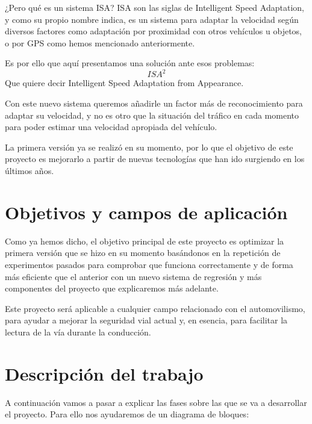 \documentclass[12pt,oneside,a4paper]{article}
\begin{document}
¿Pero qué es un sistema ISA? ISA son las siglas de Intelligent Speed Adaptation, y como su propio nombre indica, es un sistema para adaptar la velocidad según diversos factores como adaptación por proximidad con otros vehículos u objetos, o por GPS como hemos mencionado anteriormente.

Es por ello que aquí presentamos una solución ante esos problemas: \[ISA^{2}\]
Que quiere decir Intelligent Speed Adaptation from Appearance.

Con este nuevo sistema queremos añadirle un factor más de reconocimiento para adaptar su velocidad, y no es otro que la situación del tráfico en cada momento para poder estimar una velocidad apropiada del vehículo.

La primera versión ya se realizó en su momento, por lo que el objetivo de este proyecto es mejorarlo a partir de nuevas tecnologías que han ido surgiendo en los últimos años.

\section{Objetivos y campos de aplicación}

Como ya hemos dicho, el objetivo principal de este proyecto es optimizar la primera versión que se hizo en su momento basándonos en la repetición de experimentos pasados para comprobar que funciona correctamente y de forma más eficiente que el anterior con un nuevo sistema de regresión y más componentes del proyecto que explicaremos más adelante.

Este proyecto será aplicable a cualquier campo relacionado con el automovilismo, para ayudar a mejorar la seguridad vial actual y, en esencia, para facilitar la lectura de la vía durante la conducción.

\section{Descripción del trabajo}

A continuación vamos a pasar a explicar las fases sobre las que se va a desarrollar el proyecto. Para ello nos ayudaremos de un diagrama de bloques:

\begin{center}
\end{center}
\end{document}
